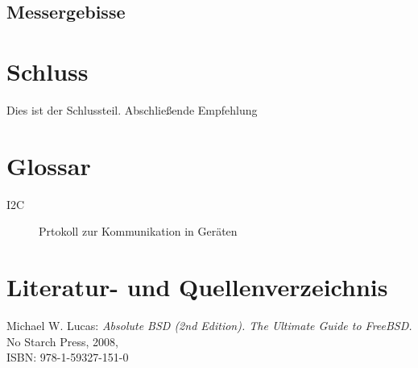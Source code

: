 \documentclass[a4paper,12pt]{scrartcl}
\begin{document}
\subsection{Messergebisse}




\clearpage
\section{Schluss}
Dies ist der Schlussteil. Abschlie\ss{}ende Empfehlung

\clearpage
\section{Glossar}
\begin{description}
 \item[I2C] Prtokoll zur Kommunikation in Ger\"aten
\end{description}

\clearpage
\section{Literatur- und Quellenverzeichnis}

\renewcommand\refname{Literaturverzeichnis}
\begin{thebibliography}{999}

Michael W. Lucas:  {\sl Absolute BSD (2nd Edition). The Ultimate Guide to FreeBSD.} No Starch Press, 2008,
\\ISBN: 978-1-59327-151-0

\end{thebibliography}
\end{document}
